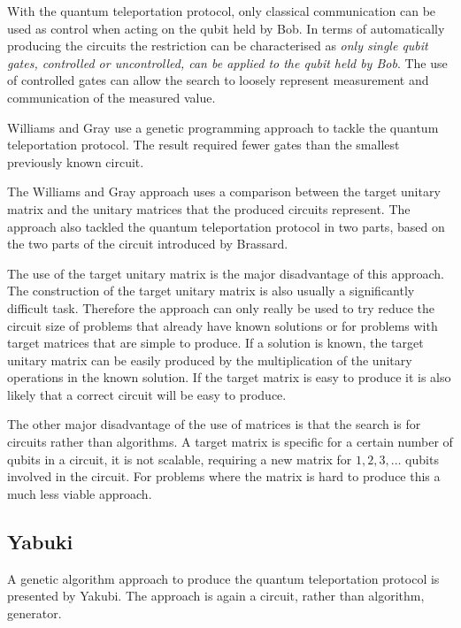 With the quantum teleportation protocol, only classical communication can be used as control when acting on the qubit held by Bob.
In terms of automatically producing the circuits the restriction can be characterised as \emph{only single qubit gates, controlled or uncontrolled, can be applied to the qubit held by Bob}.
The use of controlled gates can allow the search to loosely represent measurement and communication of the measured value.

Williams and Gray\cite{Williams:1998:ADQ:645812.670824} use a genetic programming approach to tackle the quantum teleportation protocol.
The result required fewer gates than the smallest previously known circuit.

The Williams and Gray approach uses a comparison between the target unitary matrix and the unitary matrices that the produced circuits represent.
The approach also tackled the quantum teleportation protocol in two parts, based on the two parts of the circuit introduced by Brassard\cite{1998PhyDBrassard}.

The use of the target unitary matrix is the major disadvantage of this approach.
The construction of the target unitary matrix is also usually a significantly difficult task.
Therefore the approach can only really be used to try reduce the circuit size of problems that already have known solutions or for problems with target matrices that are simple to produce.
If a solution is known, the target unitary matrix can be easily produced by the multiplication of the unitary operations in the known solution.
If the target matrix is easy to produce it is also likely that a correct circuit will be easy to produce.

The other major disadvantage of the use of matrices is that the search is for circuits rather than algorithms.
A target matrix is specific for a certain number of qubits in a circuit, it is not scalable, requiring a new matrix for $1, 2, 3,\dots$  qubits involved in the circuit.
For problems where the matrix is hard to produce this a much less viable approach.

\subsection{Yabuki}
A genetic algorithm approach to produce the quantum teleportation protocol is presented by Yakubi\cite{Yabuki00geneticalgorithms}.
The approach is again a circuit, rather than algorithm, generator.

